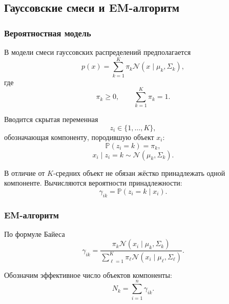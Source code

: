 \documentclass[12pt,a4paper]{article}
\theoremstyle{definition}
\theoremstyle{remark}
\newcommand{\PP}{\mathbb{P}}
\begin{document}
\subsection{Гауссовские смеси и EM-алгоритм}

\subsubsection{Вероятностная модель}

В модели смеси гауссовских распределений предполагается
\[
    p(x)
    =
    \sum_{k=1}^{K}
    \pi_k
    \mathcal{N}(x\mid\mu_k,\Sigma_k),
\]
где
\[
    \pi_k\geq 0,
    \qquad
    \sum_{k=1}^{K}\pi_k=1.
\]

Вводится скрытая переменная
\[
    z_i\in\{1,\ldots,K\},
\]
обозначающая компоненту, породившую объект $x_i$:
\[
    \PP(z_i=k)=\pi_k,
\]
\[
    x_i\mid z_i=k
    \sim
    \mathcal{N}(\mu_k,\Sigma_k).
\]

В отличие от $K$-средних объект не обязан жёстко принадлежать одной
компоненте. Вычисляются вероятности принадлежности:
\[
    \gamma_{ik}
    =
    \PP(z_i=k\mid x_i).
\]

\subsubsection{EM-алгоритм}

По формуле Байеса
\[
    \gamma_{ik}
    =
    \frac{
        \pi_k
        \mathcal{N}(x_i\mid\mu_k,\Sigma_k)
    }{
        \sum_{\ell=1}^{K}
        \pi_\ell
        \mathcal{N}(x_i\mid\mu_\ell,\Sigma_\ell)
    }.
\]

Обозначим эффективное число объектов компоненты:
\[
    N_k=\sum_{i=1}^{n}\gamma_{ik}.
\]
\end{document}
